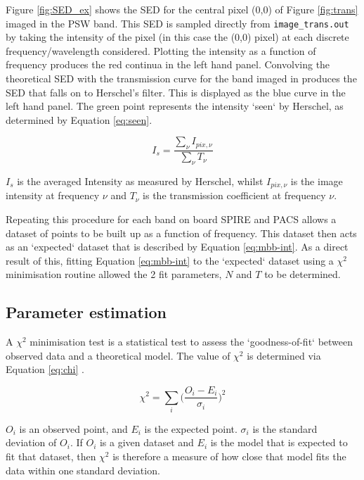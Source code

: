 \documentclass{report}
\begin{document}
Figure \ref{fig:SED_ex} shows the SED for the central pixel (0,0) of Figure \ref{fig:trans} imaged in the PSW band. This SED is sampled directly from \texttt{image\_trans.out} by taking the intensity of the pixel (in this case the (0,0) pixel) at each discrete frequency/wavelength considered. Plotting the intensity as a function of frequency produces the red continua in the left hand panel. Convolving the theoretical SED with the transmission curve for the band imaged in produces the SED that falls on to Herschel's filter. This is displayed as the blue curve in the left hand panel. The green point represents the intensity `seen` by Herschel, as determined by Equation \ref{eq:seen}.

\begin{equation}
  I_{s} = \frac{\sum_{\nu} I_{pix,\nu}}{\sum_{\nu} T_{\nu}}
\end{equation} \label{eq:seen}

$I_{s}$ is the averaged Intensity as measured by Herschel, whilst $I_{pix,\nu}$ is the image intensity at frequency $\nu$ and $T_{\nu}$ is the transmission coefficient at frequency $\nu$.

Repeating this procedure for each band on board SPIRE and PACS allows a dataset of points to be built up as a function of frequency. This dataset then acts as an `expected` dataset that is described by Equation \ref{eq:mbb-int}. As a direct result of this, fitting Equation \ref{eq:mbb-int} to the `expected` dataset using a $\chi^{2}$ minimisation routine allowed the 2 fit parameters, $N$ and $T$ to be determined.

\subsection{Parameter estimation}
A $\chi^{2}$ minimisation test is a statistical test to assess the `goodness-of-fit` between observed data and a theoretical model. The value of $\chi^{2}$ is determined via Equation \ref{eq:chi} \parencite{error}.

\begin{equation}
  \chi^{2} = \sum_{i}\Bigg (\frac{O_{i}-E_{i}}{\sigma_{i}} \Bigg )^{2}
\end{equation} \label{eq:chi}

$O_{i}$ is an observed point, and $E_{i}$ is the expected point. $\sigma_{i}$ is the standard deviation of $O_{i}$. If $O_{i}$ is a given dataset and $E_{i}$ is the model that is expected to fit that dataset, then $\chi^{2}$ is therefore a measure of how close that model fits the data within one standard deviation.
\end{document}
